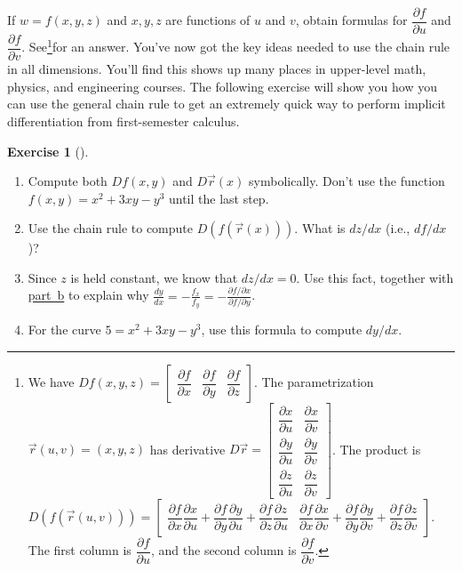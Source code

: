 \documentclass[10pt,]{book}
\theoremstyle{plain}
\theoremstyle{definition}
\theoremstyle{definition}
\theoremstyle{definition}
\theoremstyle{definition}
\newtheorem{exploration}[project]{Exercise}
\theoremstyle{definition}
\numberwithin{equation}{section}
\newcommand{\ds}{\displaystyle}
\newcommand{\amp}{&}
\begin{document}
If \(w=f(x,y,z)\) and \(x,y,z\) are functions of \(u\) and \(v\), obtain formulas for \(\dfrac{\partial f}{\partial u}\) and \(\dfrac{\partial f}{\partial v}\). See\footnote{We have \(Df(x,y,z)
=\begin{bmatrix}\dfrac{\partial f}{\partial x}\amp \dfrac{\partial f}{\partial y}\amp \dfrac{\partial f}{\partial z}
\end{bmatrix}\). The parametrization \(\vec r(u,v)=(x,y,z)\) has derivative \(D\vec r 
=\begin{bmatrix}\dfrac{\partial x}{\partial u}\amp \dfrac{\partial x}{\partial v}\\
\dfrac{\partial y}{\partial u}\amp \dfrac{\partial y}{\partial v}\\
\dfrac{\partial z}{\partial u}\amp \dfrac{\partial z}{\partial v}
\end{bmatrix}\). The product is \(D(f(\vec r(u,v)))
=\begin{bmatrix}\dfrac{\partial f}{\partial x}\dfrac{\partial x}{\partial u}+
\dfrac{\partial f}{\partial y}\dfrac{\partial y}{\partial u}+
\dfrac{\partial f}{\partial z}\dfrac{\partial z}{\partial u}\amp 
\dfrac{\partial f}{\partial x}\dfrac{\partial x}{\partial v}+
\dfrac{\partial f}{\partial y}\dfrac{\partial y}{\partial v}+
\dfrac{\partial f}{\partial z}\dfrac{\partial z}{\partial v}
\end{bmatrix}\). The first column is \(\dfrac{\partial f}{\partial u}\), and the second column is \(\dfrac{\partial f}{\partial v}\).\label{fn-5}}for an answer.%
You've now got the key ideas needed to use the chain rule in all dimensions. You'll find this shows up many places in upper-level math, physics, and engineering courses. The following exercise will show you how you can use the general chain rule to get an extremely quick way to perform implicit differentiation from first-semester calculus.%
\begin{exploration}[]\label{exploration-159}
\leavevmode%
\begin{enumerate}[font=\bfseries,label=(\alph*),ref=\alph*]
\item\label{task-369} Compute both \(Df(x,y)\) and \(D\vec r(x)\) symbolically.  Don't use the function \(f(x,y)=x^2+3xy-y^3\) until the last step.%
\item\label{item_4} Use the chain rule to compute \(D(f(\vec r(x)))\). What is \(dz/dx\) (i.e., \(df/dx\))?%
\item\label{task-371} Since \(z\) is held constant, we know that \(dz/dx=0\). Use this fact, together with \hyperref[item_4]{part~b} to explain why \(\ds \frac{dy}{dx} = -\frac{f_x}{f_y} = -\frac{\partial f/ \partial x}{\partial f/ \partial y}\).%
\item\label{task-372} For the curve \(5=x^2+3xy-y^3\), use this formula to compute \(dy/dx\).%
\end{enumerate}
\end{exploration}
\end{document}
